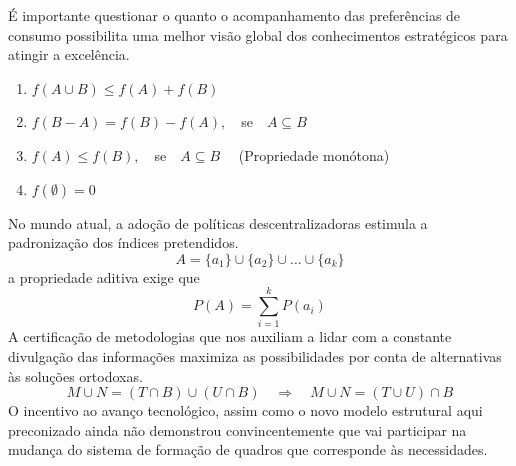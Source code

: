 \documentclass[fleqn]{icat-ufal}
\begin{document}
É importante questionar o quanto o
acompanhamento das preferências de consumo possibilita uma melhor visão global
dos conhecimentos estratégicos para atingir a excelência. 
\begin{enumerate}[label=\alph*)]
    \item $f(A\cup B)\leq f(A)+f(B)$
    \item $f(B-A)=f(B)-f(A), \quad $se$\quad A\subseteq B$
    \item $f(A)\leq f(B), \quad $se$\quad A\subseteq B \quad$ (Propriedade monótona)
    \item $f(\emptyset)=0$
\end{enumerate}
No mundo atual, a
adoção de políticas descentralizadoras estimula a padronização dos índices
pretendidos. 
\[
    A = \{a_{1}\} \cup \{a_{2}\} \cup \dots \cup \{a_{k} \}
\] 
a propriedade aditiva exige que 
\[
    P(A) = \sum_{i=1}^{k} P({a_{i}})
\]
A certificação de metodologias que nos auxiliam a lidar com a
constante divulgação das informações maximiza as possibilidades por conta de
alternativas às soluções ortodoxas. 
\[
    M \cup N = (T \cap B) \cup (U \cap B)
    \quad
    \Rightarrow 
    \quad 
    M \cup N = (T \cup U) \cap B
\]
O incentivo ao avanço tecnológico, assim
como o novo modelo estrutural aqui preconizado ainda não demonstrou
convincentemente que vai participar na mudança do sistema de formação de quadros
que corresponde às necessidades. 
\newlength{\dectobinlength} 
\setlength{\dectobinlength}{5mm}
\end{document}
